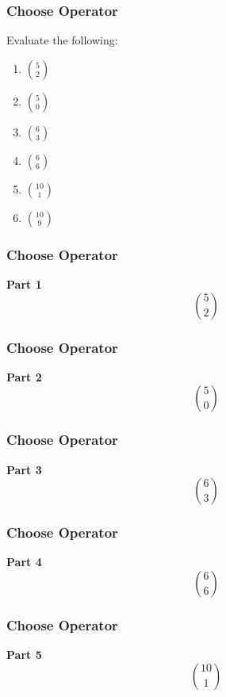 \documentclass[IntroMain.tex]{subfiles}
\begin{document}
	\begin{frame}
		\frametitle{Choose Operator}
		\Large
		\vspace{-1.5cm}
		Evaluate the following:
		\huge
		\begin{multicols}{3}
			\begin{enumerate}
				\item ${5 \choose 2}$
				\item ${5 \choose 0}$
				\item ${6 \choose 3}$
				\item ${6 \choose 6}$
				\item ${10 \choose 1}$
				\item ${10 \choose 9}$
			\end{enumerate}        
		\end{multicols}
	\end{frame}
	\begin{frame}
		\frametitle{Choose Operator}
		\large
		\vspace{-3cm}
		\textbf{Part 1}
		\huge
		\[{5 \choose 2}\]
		
	\end{frame}
	\begin{frame}
		\frametitle{Choose Operator}
		\large
		\vspace{-3cm}
		\textbf{Part 2}
		\huge
		\[{5 \choose 0}\]
		
	\end{frame}
	\begin{frame}
		\frametitle{Choose Operator}
		\large
		\vspace{-3cm}
		\textbf{Part 3}
		\huge
		\[{6 \choose 3}\]
		
	\end{frame}
	\begin{frame}
		\frametitle{Choose Operator}
		\large
		\vspace{-3cm}
		\textbf{Part 4}
		\huge
		\[{6 \choose 6}\]
		
	\end{frame}
	\begin{frame}
		\frametitle{Choose Operator}
		\large
		\vspace{-3cm}
		\textbf{Part 5}
		\huge
		\[{10 \choose 1}\]
		
	\end{frame}
\end{document}

